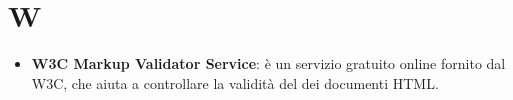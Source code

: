 \section{W}
\begin{itemize}
	\item
	\textbf{W3C Markup Validator Service}: è un servizio gratuito online fornito dal W3C, che aiuta a controllare la validità del dei documenti HTML.
	
\end{itemize}